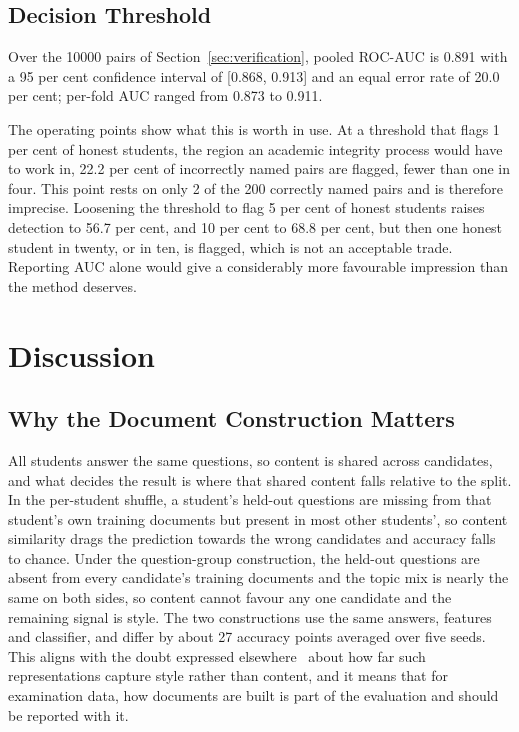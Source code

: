 \documentclass[runningheads]{llncs}
\begin{document}
\subsection{Decision Threshold}

Over the 10000 pairs of Section~\ref{sec:verification}, pooled ROC-AUC is 0.891 with a 95 per cent confidence interval of [0.868, 0.913] and an equal error rate of 20.0 per cent; per-fold AUC ranged from 0.873 to 0.911.

The operating points show what this is worth in use. At a threshold that flags 1 per cent of honest students, the region an academic integrity process would have to work in, 22.2 per cent of incorrectly named pairs are flagged, fewer than one in four. This point rests on only 2 of the 200 correctly named pairs and is therefore imprecise. Loosening the threshold to flag 5 per cent of honest students raises detection to 56.7 per cent, and 10 per cent to 68.8 per cent, but then one honest student in twenty, or in ten, is flagged, which is not an acceptable trade. Reporting AUC alone would give a considerably more favourable impression than the method deserves.

\section{Discussion}

\subsection{Why the Document Construction Matters}

All students answer the same questions, so content is shared across candidates, and what decides the result is where that shared content falls relative to the split. In the per-student shuffle, a student's held-out questions are missing from that student's own training documents but present in most other students', so content similarity drags the prediction towards the wrong candidates and accuracy falls to chance. Under the question-group construction, the held-out questions are absent from every candidate's training documents and the topic mix is nearly the same on both sides, so content cannot favour any one candidate and the remaining signal is style. The two constructions use the same answers, features and classifier, and differ by about 27 accuracy points averaged over five seeds. This aligns with the doubt expressed elsewhere~\cite{Terreau2021} about how far such representations capture style rather than content, and it means that for examination data, how documents are built is part of the evaluation and should be reported with it.
\end{document}
